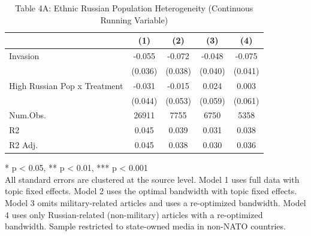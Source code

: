 \begin{table}[!t]
\caption{Table 4A: Ethnic Russian Population Heterogeneity (Continuous Running Variable)} 
\fontsize{12.0pt}{14.4pt}\selectfont
\begin{tabular*}{\linewidth}{@{\extracolsep{\fill}}lcccc}
\toprule
  & (1) & (2) & (3) & (4) \\ 
\midrule\addlinespace[2.5pt]
Invasion & -0.055 & -0.072 & -0.048 & -0.075 \\ 
 & (0.036) & (0.038) & (0.040) & (0.041) \\ 
High Russian Pop x Treatment & -0.031 & -0.015 & 0.024 & 0.003 \\ 
{} & {(0.044)} & {(0.053)} & {(0.059)} & {(0.061)} \\ 
Num.Obs. & 26911 & 7755 & 6750 & 5358 \\ 
R2 & 0.045 & 0.039 & 0.031 & 0.038 \\ 
R2 Adj. & 0.045 & 0.038 & 0.030 & 0.036 \\ 
\bottomrule
\end{tabular*}
\begin{minipage}{\linewidth}
* p < 0.05, ** p < 0.01, *** p < 0.001\\
All standard errors are clustered at the source level. Model 1 uses full data
with topic fixed effects. Model 2 uses the optimal bandwidth with topic fixed
effects. Model 3 omits military-related articles and uses a re-optimized
bandwidth. Model 4 uses only Russian-related (non-military) articles with a
re-optimized bandwidth. Sample restricted to state-owned media in non-NATO
countries.\\
\end{minipage}
\end{table}

